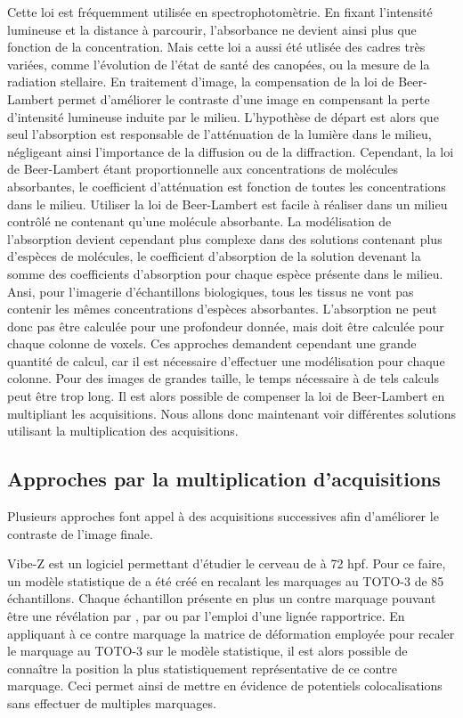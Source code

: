 \documentclass[\main/main.tex]{subfiles}
\begin{document}
%
Cette loi est fréquemment utilisée en spectrophotomètrie. En fixant l'intensité lumineuse et la distance à parcourir, l'absorbance ne devient ainsi plus que fonction de la concentration.
%
Mais cette loi a aussi été utlisée des cadres très variées, comme l'évolution de l'état de santé des canopées\cite{demattos_2020, liu_2020a}, ou la mesure de la radiation stellaire.
%
En traitement d'image, la compensation de la loi de Beer-Lambert permet d'améliorer le contraste d'une image en compensant la perte d'intensité lumineuse induite par le milieu. L'hypothèse de départ est alors que seul l'absorption est responsable de l'atténuation de la lumière dans le milieu,
négligeant ainsi l'importance de la diffusion ou de la diffraction.
%
Cependant, la loi de Beer-Lambert étant proportionnelle aux concentrations de molécules absorbantes, le coefficient d'atténuation est fonction de toutes les concentrations dans le milieu.
%
Utiliser la loi de Beer-Lambert est facile à réaliser dans un milieu contrôlé ne contenant qu'une molécule absorbante\cite{mikulewitsch_2018}. La modélisation de l'absorption devient cependant plus complexe dans des solutions contenant plus d'espèces de molécules, le coefficient d'absorption de la solution devenant la somme des coefficients d'absorption pour chaque espèce présente dans le milieu.
%
Ansi, pour l'imagerie d'échantillons biologiques, tous les tissus ne vont pas contenir les mêmes concentrations d'espèces absorbantes. L'absorption ne peut donc pas être calculée pour une profondeur donnée, mais doit être calculée pour chaque colonne de voxels\cite{ohser_2020,nylk_2018,parker_2020}.
%
Ces approches demandent cependant une grande quantité de calcul,
car il est nécessaire d'effectuer une modélisation pour chaque colonne. Pour des images de grandes taille, le temps nécessaire à de tels calculs peut être trop long.
%
Il est alors possible de compenser la loi de Beer-Lambert en multipliant les acquisitions.
%
Nous allons donc maintenant voir différentes solutions utilisant la multiplication des acquisitions.

\subsection{Approches par la multiplication d'acquisitions}

Plusieurs approches font appel à des acquisitions successives afin d'améliorer le contraste de l'image finale.
%

%
Vibe-Z\cite{ronneberger_2015} est un logiciel permettant d'étudier le cerveau de \pz{} à 72 hpf.
%
Pour ce faire, un modèle statistique de \pz{} a été créé en recalant les marquages au TOTO-3 de 85 échantillons.
%
Chaque échantillon présente en plus un contre marquage pouvant être une révélation par \fish{}, par \ihcie{} ou par l'emploi d'une lignée rapportrice. 
%
En appliquant à ce contre marquage la matrice de déformation employée pour recaler le marquage au TOTO-3 sur le modèle statistique, il est alors possible de connaître la position la plus statistiquement représentative de ce contre marquage.
%
Ceci permet ainsi de mettre en évidence de potentiels colocalisations sans effectuer de multiples marquages.
\end{document}
